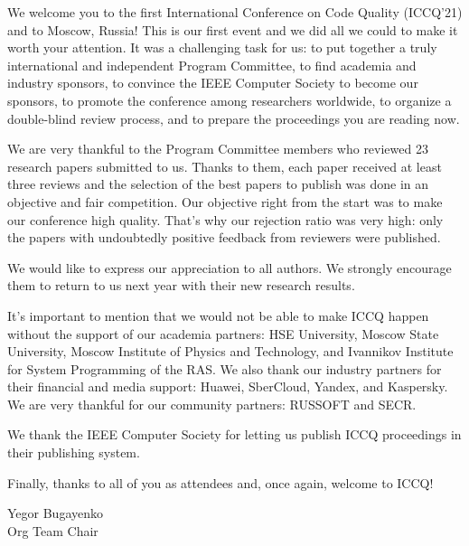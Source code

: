 \clearpage
{}

We welcome you to the first International Conference on Code Quality (ICCQ'21)
and to Moscow, Russia! This is our first event and we did all we could to make
it worth your attention. It was a challenging task for us:
to put together a truly international and independent Program Committee,
to find academia and industry sponsors,
to convince the IEEE Computer Society to become our sponsors,
to promote the conference among researchers worldwide,
to organize a double-blind review process,
and to prepare the proceedings you are reading now.

We are very thankful to the Program Committee members who
reviewed 23 research papers submitted to us. Thanks to them,
each paper received at least three reviews and the selection of the best papers to publish
was done in an objective and fair competition. Our objective right
from the start was to make our conference high quality.
That's why our rejection ratio was very high: only the
papers with undoubtedly positive feedback from reviewers were published.

We would like to express our appreciation to all authors.
We strongly encourage them to return to us next year
with their new research results.

It's important to mention that we would not be able to make
ICCQ happen without the support of our academia partners:
HSE University,
Moscow State University,
Moscow Institute of Physics and Technology,
and Ivannikov Institute for System Programming of the RAS.
We also thank our industry partners for their financial and media support:
Huawei, SberCloud, Yandex, and Kaspersky.
We are very thankful for our community partners: RUSSOFT and SECR.

We thank the IEEE Computer Society for letting us publish ICCQ proceedings
in their publishing system.

Finally, thanks to all of you as attendees and, once again, welcome to ICCQ!

Yegor Bugayenko\\
Org Team Chair
